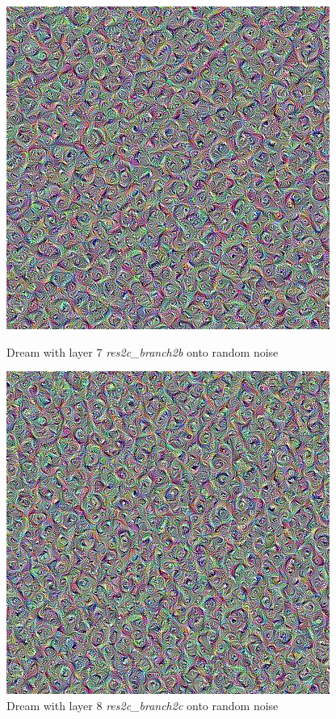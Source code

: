\begin{figure}[H]
	\centering
	\includegraphics[width=0.9\linewidth]{img/rotated_feature_1.jpg}
	\caption{Dream with layer 7 \emph{res2c\_branch2b} onto random noise}
	\label{fig:rotated_feature_1}
	\endminipage\hfill
	\centering
	\includegraphics[width=0.9\linewidth]{img/rotated_feature_2.jpg}
	\caption{Dream with layer 8 \emph{res2c\_branch2c} onto random noise}
	\label{fig:rotated_feature_2}
	\endminipage\hfill
\end{figure}

